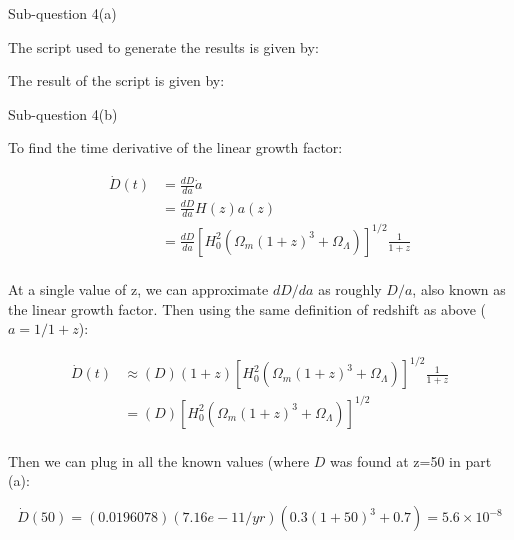 \begin{subsection}{Sub-question 4(a)}

The script used to generate the results is given by:




The result of the script is given by:



\end{subsection}


\begin{subsection}{Sub-question 4(b)}
  
To find the time derivative of the linear growth factor:

\begin{align}
  \dot{D}(t) &= \frac{dD}{da}\dot{a} \\
             &= \frac{dD}{da}H(z)a(z)\\
             &= \frac{dD}{da}\left[H_0^2(\Omega_m(1+z)^3+\Omega_\Lambda)\right]^{1/2}\frac{1}{1+z}\\
\end{align}

At a single value of z, we can approximate $dD/da$ as roughly $D/a$, also known as the linear growth factor. Then using the same definition of redshift as above ($a=1/1+z$):

\begin{align}
  \dot{D}(t) &\approx (D)(1+z)\left[H_0^2(\Omega_m(1+z)^3+\Omega_\Lambda)\right]^{1/2}\frac{1}{1+z}\\
             &=(D)\left[H_0^2(\Omega_m(1+z)^3+\Omega_\Lambda)\right]^{1/2}\\
\end{align}

Then we can plug in all the known values (where $D$ was found at z=50 in part (a):



\begin{equation}
  \dot{D}(50) = (0.0196078)(7.16e-11/yr)(0.3(1+50)^3+0.7) = 5.6 \times 10^{-8}
\end{equation}

\end{subsection}